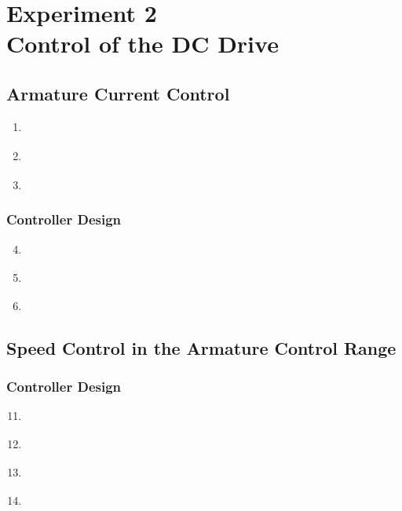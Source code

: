 \documentclass[12pt,a4paper, openany]{book}
\begin{document}




\setcounter{chapter}{1} %
\chapter{Experiment 2 \\ Control of the DC Drive}

 \setcounter{section}{2} %
\section{Armature Current Control}

\begin{enumerate}
\item {\bf *}  
\item {\bf *} 
\item {\bf *} 
\end{enumerate}
\subsection{Controller Design}

\begin{enumerate}
\setcounter{enumi}{3} %
\item {\bf *} 
\item {\bf *} 
\item {\bf *} 
\end{enumerate}

\section{Speed Control in the Armature Control Range}
\subsection{Controller Design}
\begin{enumerate}
\setcounter{enumi}{10} %
\item {\bf *} 
\item {\bf *} 
\item {\bf *}   
\item {\bf *}
\end{enumerate}
\end{document}
